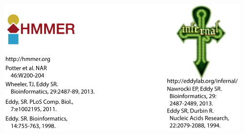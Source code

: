 \documentclass[landscape]{slides}
\begin{document}
\begin{slide}
\begin{center}
\hspace{1.8in}\includegraphics[height=2.7in]{figs/hmmer-infernal-refs-2019}

\end{center}

\vfill

\end{slide}
\end{document}
